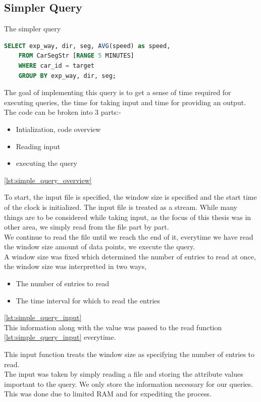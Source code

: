 \subsection{Simpler Query}
The simpler query
\begin{lstlisting}[language=SQL,caption=simple query]
    SELECT exp_way, dir, seg, AVG(speed) as speed,
    FROM CarSegStr [RANGE 5 MINUTES]
    WHERE car_id = target
    GROUP BY exp_way, dir, seg;
\end{lstlisting}
The goal of implementing this query is to get a sense of time required for executing queries, the time for taking input and time for providing an output.\\
The code can be broken into $3$ parts:-
\begin{itemize}
    \item Intialization, code overview
    \item Reading input
    \item executing the query
\end{itemize}
\ref{lst:simple_query_overview}
\par To start, the input file is specified, the window size is specified and the start time of the clock is initialized. The input file is treated as a stream. While many things are to be considered while taking input, as the focus of this thesis was in other area, we simply read from the file part by part.\\
We continue to read the file until we reach the end of it, everytime we have read the window size amount of data points, we execute the query.\\
A window size was fixed which determined the number of entries to read at once, the window size was interpretted in two ways,
\begin{itemize}
\item The number of entries to read 
\item The time interval for which to read the entries
\end{itemize}
\ref{lst:simple_query_input}\\
This information along with the value was passed to the read function \ref{lst:simple_query_input} everytime.
\par This input function treats the window size as specifying the number of entries to read.\\
The input was taken by simply reading a file and storing the attribute values important to the query. We only store the information necessary for our queries. This was done due to limited RAM and for expediting the process.\\
